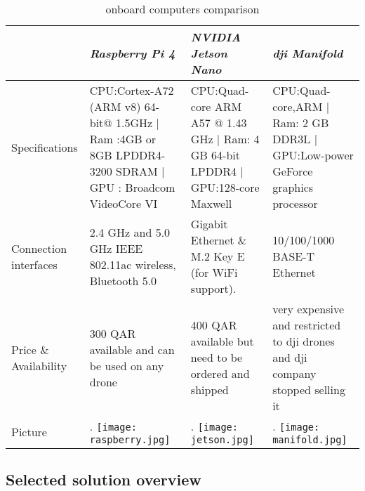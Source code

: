 \documentclass[../main.tex]{subfiles}
\begin{document}
\begin{table}[hbt!]
	\begin{tabular}{ | p{3cm} | p{4cm}| p{4cm} | p{4cm} |}
		\hline
		\textit{} & \textit{Raspberry Pi 4} & \textit{NVIDIA Jetson Nano} & \textit{dji Manifold}\\ \hline
		Specifications  & CPU:Cortex-A72 (ARM v8) 64-bit@ 1.5GHz | Ram :4GB or 8GB LPDDR4-3200 SDRAM | GPU : Broadcom VideoCore VI & CPU:Quad-core ARM A57 @ 1.43 GHz | Ram: 4 GB 64-bit LPDDR4   | GPU:128-core Maxwell & CPU:Quad-core,ARM | Ram: 2 GB DDR3L | GPU:Low-power GeForce graphics processor \\ \hline
		Connection interfaces & 2.4 GHz and 5.0 GHz IEEE 802.11ac wireless, Bluetooth 5.0 & Gigabit Ethernet \& M.2 Key E (for WiFi support). &10/100/1000 BASE-T Ethernet \\ \hline
		
		Price \& Availability & 300 QAR available and can be used on any drone & 400 QAR available but need to be ordered and shipped & very expensive and restricted to dji drones and dji company stopped selling it    \\ \hline
		Picture & \begin{minipage}{.2\textwidth}.
			\texttt{[image: raspberry.jpg]}
		\end{minipage}  & \begin{minipage}{.2\textwidth}.
		\texttt{[image: jetson.jpg]}
	\end{minipage} & \begin{minipage}{.2\textwidth}.
	\texttt{[image: manifold.jpg]}
\end{minipage} \\ \hline
		
		
		
	\end{tabular}
	\caption{onboard computers comparison}
\end{table} \label{tab: onboard computers }  
\newpage
\subsection{Selected solution overview}
\end{document}
